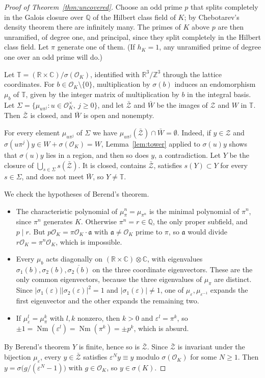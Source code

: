 \documentclass[11pt]{amsart}
\theoremstyle{definition}
\theoremstyle{remark}
\numberwithin{equation}{section}
\newcommand{\Q}{\mathbb{Q}}
\newcommand{\Z}{\mathbb{Z}}
\newcommand{\R}{\mathbb{R}}
\newcommand{\C}{\mathbb{C}}
\newcommand{\cO}{\mathcal{O}}
\newcommand{\Nm}{\operatorname{Nm}}
\begin{document}
\begin{proof}[Proof of Theorem~\ref{thm:uncovered}]
Choose an odd prime $p$ that splits completely in the Galois closure over $\Q$ of the Hilbert
class field of $K$; by Chebotarev's density theorem there are infinitely many. The primes of $K$
above $p$ are then unramified, of degree one, and principal, since they split completely in the
Hilbert class field. Let $\pi$ generate one of them. (If $h_K=1$, any unramified prime of degree
one over an odd prime will do.)

Let $\mathbb T=(\R\times\C)/\sigma(\cO_K)$, identified with $\R^3/\Z^3$ through the lattice
coordinates. For $b\in\cO_K\setminus\{0\}$, multiplication by $\sigma(b)$ induces an endomorphism
$\mu_b$ of $\mathbb T$, given by the integer matrix of multiplication by $b$ in the integral
basis. Let $\Sigma=\{\mu_{u\pi^j}: u\in\cO_K^\times,\ j\ge0\}$, and let $\bar{\mathcal Z}$ and $\bar W$ be
the images of $\mathcal Z$ and $W$ in $\mathbb T$. Then $\bar{\mathcal Z}$ is closed, and $\bar W$ is open and
nonempty.

For every element $\mu_{u\pi^j}$ of $\Sigma$ we have $\mu_{u\pi^j}(\bar{\mathcal Z})\cap\bar W=\emptyset$.
Indeed, if $y\in \mathcal Z$ and $\sigma(u\pi^j)y\in W+\sigma(\cO_K)=W$, Lemma~\ref{lem:tower} applied to
$\sigma(u)y$ shows that $\sigma(u)y$ lies in a region, and then so does $y$, a contradiction. Let
$Y$ be the closure of $\bigcup_{s\in\Sigma}s(\bar{\mathcal Z})$. It is closed, contains $\bar{\mathcal Z}$, satisfies
$s(Y)\subset Y$ for every $s\in\Sigma$, and does not meet $\bar W$, so $Y\ne\mathbb T$.

We check the hypotheses of Berend's theorem.
\begin{itemize}
\item[(B1)] The characteristic polynomial of $\mu_\pi^n=\mu_{\pi^n}$ is the minimal polynomial
of $\pi^n$, since $\pi^n$ generates $K$. Otherwise $\pi^n=r\in\Q$, the only proper subfield,
and $p\mid r$. But $p\cO_K=\pi\cO_K\cdot\mathfrak a$ with $\mathfrak a\ne\cO_K$ prime to $\pi$,
so $\mathfrak a$ would divide $r\cO_K=\pi^n\cO_K$, which is impossible.
\item[(B2)] Every $\mu_b$ acts diagonally on $(\R\times\C)\otimes\C$, with eigenvalues
$\sigma_1(b),\sigma_2(b),\overline{\sigma_2(b)}$ on the three coordinate eigenvectors. These
are the only common eigenvectors, because the three eigenvalues of $\mu_\pi$ are distinct. Since
$|\sigma_1(\varepsilon)||\sigma_2(\varepsilon)|^2=1$ and $|\sigma_1(\varepsilon)|\ne1$, one
of $\mu_\varepsilon,\mu_{\varepsilon^{-1}}$ expands the first eigenvector and the other
expands the remaining two.
\item[(B3)] If $\mu_\varepsilon^l=\mu_\pi^k$ with $l,k$ nonzero, then $k>0$ and
$\varepsilon^l=\pi^k$, so $\pm1=\Nm(\varepsilon^l)=\Nm(\pi^k)=\pm p^k$, which is absurd.
\end{itemize}
By Berend's theorem $Y$ is finite, hence so is $\bar{\mathcal Z}$. Since $\bar{\mathcal Z}$ is invariant under the
bijection $\mu_\varepsilon$, every $y\in\bar{\mathcal Z}$ satisfies $\varepsilon^Ny\equiv y$ modulo
$\sigma(\cO_K)$ for some $N\ge1$. Then $y=\sigma\bigl(g/(\varepsilon^N-1)\bigr)$ with
$g\in\cO_K$, so $y\in\sigma(K)$.
\end{proof}
\end{document}
